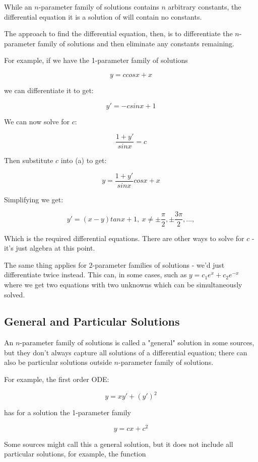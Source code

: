\documentclass{article}
\begin{document}
While an $n$-parameter family of solutions contains $n$ arbitrary constants, the differential equation it is a solution of will contain no constants.

The approach to find the differential equation, then, is to differentiate the $n$-parameter family of solutions and then eliminate any constants remaining.

For example, if we have the 1-parameter family of solutions

\[ \tag{a} y = ccosx+x \]

we can differentiate it to get:

\[ \tag{b} y' = -csinx + 1 \]

We can now solve for $c$:

\[ \frac{1 + y'}{sinx} = c \]

Then substitute $c$ into (a) to get:

\[ y = \frac{1 + y'}{sinx}cosx+x \]

Simplifying we get:

\[ y' = (x - y)tanx + 1,~x \neq \pm \frac{\pi}{2},\pm\frac{3\pi}{2},\ldots, \]

Which is the required differential equations. There are other ways to solve for $c$ - it's just algebra at this point.

The same thing applies for $2$-parameter families of solutions - we'd just differentiate twice instead. This can, in some cases, such as $y =c_1e^x + c_2e^{-x}$ where we get two equations with two unknowns which can be simultaneously solved.

\subsection{General and Particular Solutions}

An $n$-parameter family of solutions is called a "general" solution in some sources, but they don't always capture all solutions of a differential equation; there can also be particular solutions outside $n$-parameter family of solutions.

For example, the first order ODE:

\[ y = xy' + (y')^2 \tag{4.6} \]

has for a solution the 1-parameter family

\[ y = cx + c^2 \tag{4.61} \]

Some sources might call this a general solution, but it does not include all particular solutions, for example, the function
\end{document}

